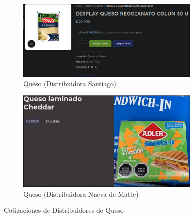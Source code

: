 \documentclass[12pt]{article}
\begin{document}
        \begin{figure}[h!] %
            \centering
            \begin{subfigure}{0.45\textwidth}
                \centering
                \includegraphics[width=0.9\linewidth]{santiago} %
                \caption{Queso (Distribuidora Santiago)}
                \label{fig:distribuidora_santiago}
            \end{subfigure}
            \hfill
            \begin{subfigure}{0.45\textwidth}
                \centering
                \includegraphics[width=0.9\linewidth]{nueva} %
                \caption{Queso (Distribuidora Nueva de Matte)}
                \label{fig:distribuidora_nueva_de_matte}
            \end{subfigure}
            \caption{Cotizaciones de Distribuidores de Queso}
            \label{fig:cotizaciones_queso}
        \end{figure} %
\end{document}
